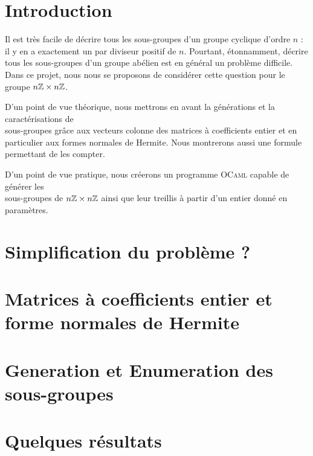 \documentclass[11pt]{article}
\newcommand*{\ZZ}{n\Z \x n\Z}
\begin{document}

\tableofcontents

\newpage

\section{Introduction}
	Il est très facile de décrire tous les sous-groupes d'un groupe cyclique
	d'ordre $n$ : il y en a exactement un par diviseur positif de $n$.
	Pourtant, étonnamment, décrire tous les sous-groupes d'un groupe abélien
	est en général un problème difficile.\\
	Dans ce projet, nous nous se proposons de considérer cette question pour le groupe $\ZZ$.

	D'un point de vue théorique, nous mettrons en avant la générations et la caractérisations de \\
	sous-groupes grâce aux vecteurs colonne des matrices à coefficients entier et en particulier aux formes
	normales de Hermite. Nous montrerons aussi une formule permettant de les compter.

	D'un point de vue pratique, nous créerons un programme \textsc{OCaml} capable de générer les\\
	sous-groupes de $\ZZ$ ainsi que leur treillis à partir d'un entier donné en paramètres.


\section{Simplification du problème ?}

\section{Matrices à coefficients entier et forme normales de Hermite}

%

\section {Generation et Enumeration des sous-groupes}

\section {Quelques résultats}
\end{document}
